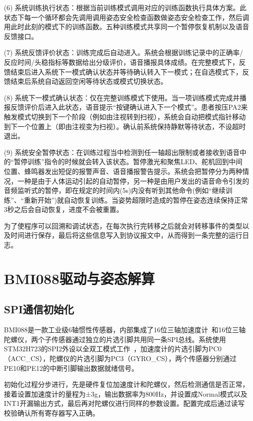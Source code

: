 (6) 系统训练执行状态：根据当前训练模式调用对应的训练函数执行具体方案。此状态下每一个循环都会先调用调用姿态安全检查函数做姿态安全检查工作，然后调用此时此刻的模式下的训练函数。五种训练模式共享同一个暂停恢复机制以及语音反馈接口。

(7) 系统反馈评价状态：训练完成后自动进入。系统会根据训练记录中的正确率/反应时间/头稳指标等数据给出分级评价，语音播报具体成绩。在完整模式下，反馈结束后进入系统下一模式确认状态并等待确认转入下一模式；在自选模式下，反馈结束后系统自动返回空闲等待状态或模式切换状态。

(8) 系统下一模式确认状态：仅在完整训练模式下使用。当一项训练模式完成并播报反馈评价后进入此状态，语音提示“按键确认进入下一个模式”。患者按压PA2来触发模式切换到下一个阶段（例如由注视转到扫视），系统会自动把模式指针移动到下一个位置上（即由注视变为扫视）。确认前系统保持静默等待状态，不设超时退出。

(9) 系统安全暂停状态：在训练过程当中检测到任一轴超出限制或者接收到语音中的“暂停训练”指令的时候就会转入该状态。暂停激光和聚焦LED、舵机回到中间位置、蜂鸣器发出短促的报警声音、语音播报警告提示。系统会把暂停分为两种情况，一种是由于人体运动引起的自动暂停，另一种是由用户发出的语音命令引发的音频监听式的暂停，即在规定的时间内(5s)内没有听到其他命令(例如“继续训练”、“重新开始”)就自动恢复训练。当姿势超限时造成的暂停在姿态连续保持正常3秒之后会自动恢复，进度不会被重置。

为了使程序可以回溯和调试状态，在每次执行完转移之后就会对转移事件的类型以及时间进行保存，最后将这些信息写入到协议报文中，从而得到一条完整的运行日志。

\section{BMI088驱动与姿态解算}

\subsection{SPI通信初始化}

BMI088是一款工业级6轴惯性传感器，内部集成了16位三轴加速度计~\cite{bmi088_ds}和16位三轴陀螺仪，两个子传感器通过独立的片选引脚共用同一条SPI总线。系统使用STM32H723的SPI2外设以全双工模式工作~\cite{stm32h7_rm}，加速度计的片选引脚为PC0（ACC\_CS），陀螺仪的片选引脚为PC3（GYRO\_CS），两个传感器分别通过PE10和PE12的中断引脚输出数据就绪信号。

初始化过程分步进行，先是硬件复位加速度计和陀螺仪，然后检测通信是否正常，接着设置加速度计的量程为±3g，输出数据率为800Hz，并设置成Normal模式以及INT1开漏输出方式，最后再对陀螺仪进行同样的参数设置。配置完成后通过读写校验确认所有寄存器写入正确。

